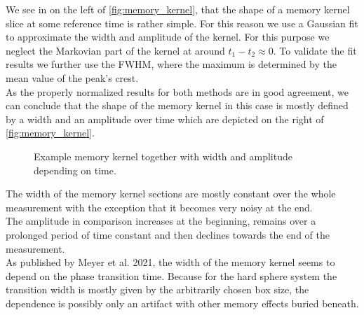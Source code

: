 We see in on the left of \autoref{fig:memory_kernel}, that the shape of a memory kernel slice at some reference time is rather simple. For this reason we use a Gaussian fit to approximate the width and amplitude of the kernel. For this purpose we neglect the Markovian part of the kernel at around $t_1-t_2 \approx 0$. To validate the fit results we further use the FWHM, where the maximum is determined by the mean value of the peak's crest.\\
As the properly normalized results for both methods are in good agreement, we can conclude that the shape of the memory kernel in this case is mostly defined by a width and an amplitude over time which are depicted on the right of \autoref{fig:memory_kernel}.\\

\begin{figure}[ht]
\begin{center}
 \hspace{0.5cm}
\caption[Width and amplitude of memory kernel with example slice]{Example memory kernel together with width and amplitude depending on time.}
\label{fig:memory_kernel}
\end{center}
\end{figure}

The width of the memory kernel sections are mostly constant over the whole measurement with the exception that it becomes very noisy at the end.\\
The amplitude in comparison increases at the beginning, remains over a prolonged period of time constant and then declines towards the end of the measurement.\\
As published by Meyer et al. 2021\cite{Meyer2021}, the width of the memory kernel seems to depend on the phase transition time. Because for the hard sphere system the transition width is mostly given by the arbitrarily chosen box size, the dependence is possibly only an artifact with other memory effects buried beneath.\\ 

